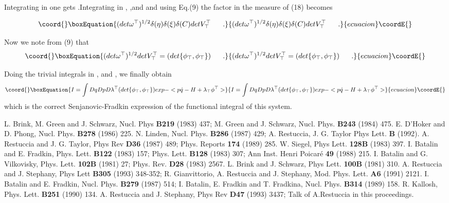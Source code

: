 \documentclass[a4paper,10pt]{article}
\begin{document}
Integrating in \myHighlight{$\theta$}\coordHE{} one gets \myHighlight{$\delta (\mu )$}\coordHE{}.Integrating in \coordHE{},
\coordHE{},and \coordHE{} and using Eq.(9) the factor in the
measure of (18) becomes

\begin{equation}\coord{}\boxEquation{
\label{20}
(det \omega^\top )^{1/2}\delta (\eta )\delta (\xi )\delta (C)det V_{\top}^\top
\ \ \ \ \ .
}{
(det \omega^\top )^{1/2}\delta (\eta )\delta (\xi )\delta (C)det V_{\top}^\top
\ \ \ \ \ .
}{ecuacion}\coordE{}\end{equation}


Now we note from (9) that
\begin{equation}\coord{}\boxEquation{
\label{21}
(det \omega^\top )^{1/2}det V_{\top}^\top =(det \{\phi_\top ,\phi_\top \} )
\ \ \ \ \ .
}{
(det \omega^\top )^{1/2}det V_{\top}^\top =(det \{\phi_\top ,\phi_\top \} )
\ \ \ \ \ .
}{ecuacion}\coordE{}\end{equation}

Doing the trivial integrals in \myHighlight{$\eta$}\coordHE{}, \myHighlight{$\xi$}\coordHE{} and \coordHE{}, we  finally obtain
\begin{equation}\coord{}\boxEquation{
\label{22}
I=\int \D q \D p \D \lambda^\top (det \{\phi_\top ,\phi_\top \})exp-
<p\dot{q}-H+\lambda_\top \phi^\top >
}{
I=\int \D q \D p \D \lambda^\top (det \{\phi_\top ,\phi_\top \})exp-
<p\dot{q}-H+\lambda_\top \phi^\top >
}{ecuacion}\coordE{}\end{equation}
which is the correct Senjanovic-Fradkin expression of the functional integral
of this system.


\begin{thebibliography}{99}


\bibitem{[1]}L. Brink, M. Green and J. Schwarz, Nucl. Phys {\bf B219} (1983) 437;
M. Green and J. Schwarz, Nucl. Phys. {\bf B243} (1984) 475.
\bibitem{[2]}E. D'Hoker and D. Phong, Nucl. Phys. {\bf B278} (1986) 225.
\bibitem{[3]}N. Linden, Nucl. Phys. {\bf B286} (1987) 429;
A. Restuccia, J. G. Taylor Phys Lett. {\bf B} (1992).
\bibitem{[4]}A. Restuccia and J. G. Taylor, Phys Rev {\bf D36} (1987) 489; Phys.
Reports {\bf 174} (1989) 285.
\bibitem{[5]}W. Siegel, Phys Lett. {\bf 128B} (1983)
397.
\bibitem{[6]}I. Batalin and E. Fradkin, Phys. Lett. {\bf B122} (1983) 157;
Phys. Lett. {\bf B128} (1983) 307;
Ann Inst. Henri Poicar\'e {\bf 49} (1988) 215.
\bibitem{[7]}I. Batalin and G. Vilkovisky, Phys. Lett. {\bf 102B} (1981) 27;
Phys. Rev. {\bf D28} (1983) 2567.
\bibitem{[8]}L. Brink and J. Schwarz, Phys Lett. {\bf 100B} (1981) 310.
\bibitem{[9]}A. Restuccia and J. Stephany,  Phys Lett {\bf B305} (1993) 348-352;
R. Gianvittorio, A. Restuccia and J. Stephany, Mod. Phys. Lett. {\bf A6}  (1991) 2121.
\bibitem{[10]}I. Batalin and E. Fradkin, Nucl. Phys. {\bf B279} (1987) 514;
I. Batalin, E. Fradkin and T. Fradkina, Nucl. Phys. {\bf B314} (1989) 158.
\bibitem{[11]}R. Kallosh, Phys. Lett. {\bf B251} (1990) 134.
\bibitem{[12]}A. Restuccia and J. Stephany,   Phys Rev  {\bf D47} (1993) 3437;
Talk of A.Restuccia in this proceedings.
\end{thebibliography}
\end{document}
